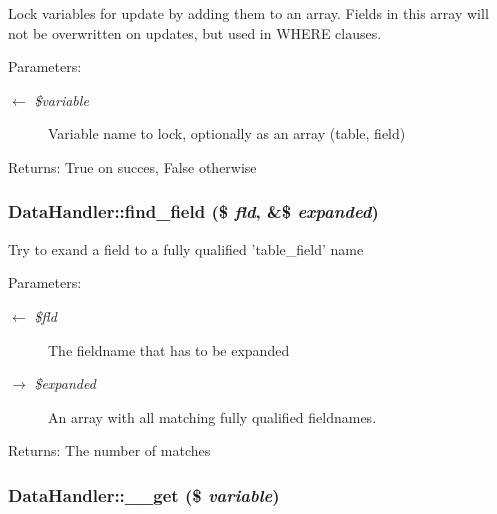 Lock variables for update by adding them to an array. Fields in this array will not be overwritten on updates, but used in WHERE clauses. \begin{Desc}
\item[Parameters:]
\begin{description}
\item[\mbox{$\leftarrow$} {\em \$variable}]Variable name to lock, optionally as an array (table, field) \end{description}
\end{Desc}
\begin{Desc}
\item[Returns:]True on succes, False otherwise \end{Desc}
\hypertarget{classDataHandler_1e4789e22370c96ae479bc3a58f30984}{
\subsubsection{\setlength{\rightskip}{0pt plus 5cm}DataHandler::find\_\-field (\$ {\em fld}, \&\$ {\em expanded})}}
\label{classDataHandler_1e4789e22370c96ae479bc3a58f30984}


Try to exand a field to a fully qualified 'table\_\-field' name

\begin{Desc}
\item[Parameters:]
\begin{description}
\item[\mbox{$\leftarrow$} {\em \$fld}]The fieldname that has to be expanded \item[\mbox{$\rightarrow$} {\em \$expanded}]An array with all matching fully qualified fieldnames. \end{description}
\end{Desc}
\begin{Desc}
\item[Returns:]The number of matches \end{Desc}
\hypertarget{classDataHandler_f58cbd10b032e4904fa15ce950d521e2}{
\subsubsection{\setlength{\rightskip}{0pt plus 5cm}DataHandler::\_\-\_\-get (\$ {\em variable})}}
\label{classDataHandler_f58cbd10b032e4904fa15ce950d521e2}


